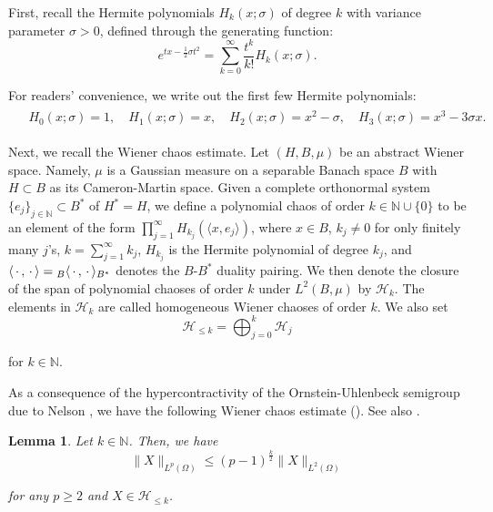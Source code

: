 \documentclass[letterpaper, 11pt,  reqno]{amsart}
\newtheorem{lemma}[theorem]{Lemma}
\newcommand{\1}{\hspace{0.5mm}\text{I}\hspace{0.2mm}}
\newcommand{\noi}{\noindent}
\newcommand{\N}{\mathbb{N}}
\renewcommand{\H}{\mathcal{H}}
\newcommand{\s}{\sigma}
\newcommand{\jb}[1]{\langle #1 \rangle}
\renewcommand{\O}{\Omega}
\numberwithin{equation}{section}
\numberwithin{theorem}{section}
\begin{document}
First, 
recall the Hermite polynomials $H_k(x; \s)$ 
of degree $k$
with variance parameter $\s > 0$, 
defined through the generating function:
\begin{equation*}
 e^{tx - \frac{1}{2}\s t^2} = \sum_{k = 0}^\infty \frac{t^k}{k!} H_k(x;\s).
 \end{equation*}
	
\noi
For readers' convenience, we write out the first few Hermite polynomials:
\begin{align*}
\begin{split}
& H_0(x; \s) = 1, 
\quad 
H_1(x; \s) = x, 
\quad
H_2(x; \s) = x^2 - \s,   
\quad
 H_3(x; \s) = x^3 - 3\s x.
\end{split}
\end{align*}
	


Next, we recall the Wiener chaos estimate.
Let $(H, B, \mu)$ be an abstract Wiener space.
Namely, $\mu$ is a Gaussian measure on a separable Banach space $B$
with $H \subset B$ as its Cameron-Martin space.
Given  a complete orthonormal system $\{e_j \}_{ j \in \N} \subset B^*$ of $H^* = H$, 
we  define a polynomial chaos of order
$k \in \N\cup\{0\}$ to be an element of the form $\prod_{j = 1}^\infty H_{k_j}(\jb{x, e_j})$, 
where $x \in B$, $k_j \ne 0$ for only finitely many $j$'s, $k= \sum_{j = 1}^\infty k_j$, 
$H_{k_j}$ is the Hermite polynomial of degree $k_j$, 
and $\jb{\,\cdot\,, \,\cdot\,} = \vphantom{|}_B \jb{\,\cdot\,, \,\cdot\,}_{B^*}$ denotes the $B$-$B^*$ duality pairing.
We then 
denote the closure  of the span of
polynomial chaoses of order $k$ 
under $L^2(B, \mu)$ by $\mathcal{H}_k$.
The elements in $\H_k$ 
are called homogeneous Wiener chaoses of order $k$.
We also set
\[ \H_{\leq k} = \bigoplus_{j = 0}^k \H_j\]

\noi
 for $k \in \N$.

As a consequence
of the  hypercontractivity of the Ornstein-Uhlenbeck
semigroup  due to Nelson \cite{Nelson2}, 
we have the following Wiener chaos estimate
(\cite[Theorem~I.22]{Simon}).
See also \cite[Proposition~2.4]{TTz}.


\begin{lemma}\label{LEM:hyp}
Let $k \in \N$.
Then, we have
\begin{equation*}
\|X \|_{L^p(\O)} \leq (p-1)^\frac{k}{2} \|X\|_{L^2(\O)}
 \end{equation*}
 
 \noi
 for any $p \geq 2$
 and $X \in \H_{\leq k}$.



\end{lemma}
\end{document}
